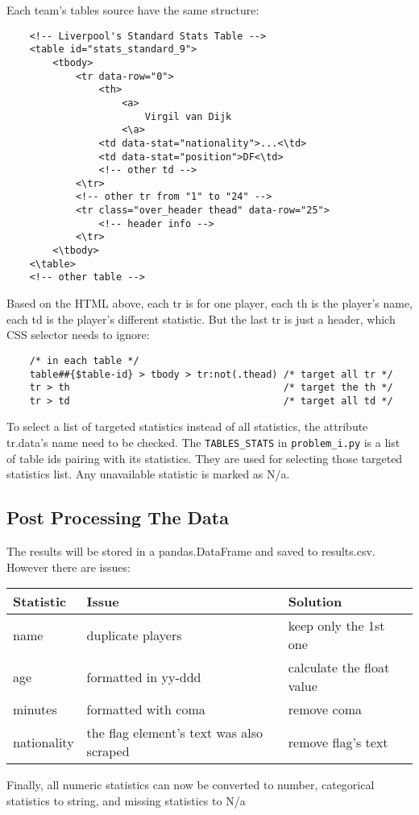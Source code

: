 \documentclass{report}
\begin{document}
Each team's tables source have the same structure:
\begin{verbatim}
    <!-- Liverpool's Standard Stats Table -->
    <table id="stats_standard_9">
        <tbody>
            <tr data-row="0">
                <th>
                    <a>
                        Virgil van Dijk
                    <\a>
                <td data-stat="nationality">...<\td>
                <td data-stat="position">DF<\td>
                <!-- other td -->
            <\tr>
            <!-- other tr from "1" to "24" -->
            <tr class="over_header thead" data-row="25">
                <!-- header info -->
            <\tr>
        <\tbody>
    <\table>
    <!-- other table -->
\end{verbatim}

\noindent Based on the HTML above, each tr is for one player, each th is the player's name, each td is the 
player's different statistic. But the last tr is just a header, which CSS selector needs to ignore:
\begin{verbatim}
    /* in each table */
    table##{$table-id} > tbody > tr:not(.thead) /* target all tr */ 
    tr > th                                     /* target the th */
    tr > td                                     /* target all td */
\end{verbatim}

\noindent To select a list of targeted statistics instead of all statistics, the attribute tr.data's 
name need to be checked. The \verb|TABLES_STATS| in \verb|problem_i.py| is a list of 
table ids pairing with its statistics. They are used for selecting those targeted statistics list. 
Any unavailable statistic is marked as N/a.

\subsection{Post Processing The Data}
The results will be stored in a pandas.DataFrame and saved to results.csv. However there are issues:
\begin{center}
\centering
    \begin{tabular}{|l|l|l|}
    \hline
    Statistic & Issue & Solution \\
    \hline
    name & duplicate players & keep only the 1st one \\
    \hline
    age & formatted in yy-ddd & calculate the float value \\
    \hline
    minutes & formatted with coma & remove coma \\
    \hline
    nationality & the flag element's text was also scraped & remove flag's text \\
    \hline
    \end{tabular}
\end{center}
Finally, all numeric statistics can now be converted to number, categorical statistics to string, and
missing statistics to N/a
\end{document}
